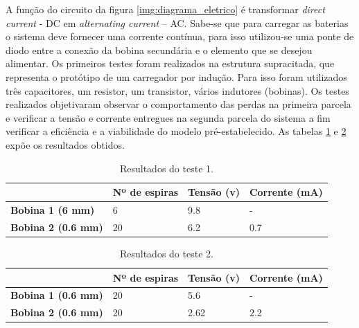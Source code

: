 A função do circuito da figura \ref{img:diagrama_eletrico} é transformar \textit{direct current} - DC em \textit{alternating current} – AC. Sabe-se que para carregar as baterias o sistema deve fornecer uma corrente contínua, para isso utilizou-se uma ponte de diodo entre a conexão da bobina secundária e o elemento que se desejou alimentar.
Os primeiros testes foram realizados na estrutura supracitada, que representa o protótipo de um carregador por indução. Para isso foram utilizados três capacitores, um resistor, um transistor, vários indutores (bobinas).
Os testes realizados objetivaram observar o comportamento das perdas na primeira parcela e verificar a tensão e corrente entregues na segunda parcela do sistema a fim verificar a eficiência e a viabilidade do modelo pré-estabelecido.
As tabelas \ref{tab:resultadotestescarregadorinducao} e \ref{tab:resultadotestescarregadorinducao2} expõe os resultados obtidos.

\begin{table}[]
\centering
\caption{Resultados do teste 1.}
\label{tab:resultadotestescarregadorinducao}
\begin{tabular}{l|l|l|l|}
\cline{2-4}
\textbf{}                                        & \textbf{Nº de espiras} & \textbf{Tensão (v)} & \textbf{Corrente (mA)} \\ \hline
\multicolumn{1}{|l|}{\textbf{Bobina 1 (6 mm)}}   & 6                      & 9.8                 & -                      \\ \hline
\multicolumn{1}{|l|}{\textbf{Bobina 2 (0.6 mm)}} & 20                     & 6.2                 & 0.7                    \\ \hline
\end{tabular}
\end{table}

\begin{table}[]
\centering
\caption{Resultados do teste 2.}
\label{tab:resultadotestescarregadorinducao2}
\begin{tabular}{l|l|l|l|}
\cline{2-4}
\textbf{}                                        & \textbf{Nº de espiras} & \textbf{Tensão (v)} & \textbf{Corrente (mA)} \\ \hline
\multicolumn{1}{|l|}{\textbf{Bobina 1 (0.6 mm)}} & 20                     & 5.6                 & -                      \\ \hline
\multicolumn{1}{|l|}{\textbf{Bobina 2 (0.6 mm)}} & 20                     & 2.62                & 2.2                    \\ \hline
\end{tabular}
\end{table}

